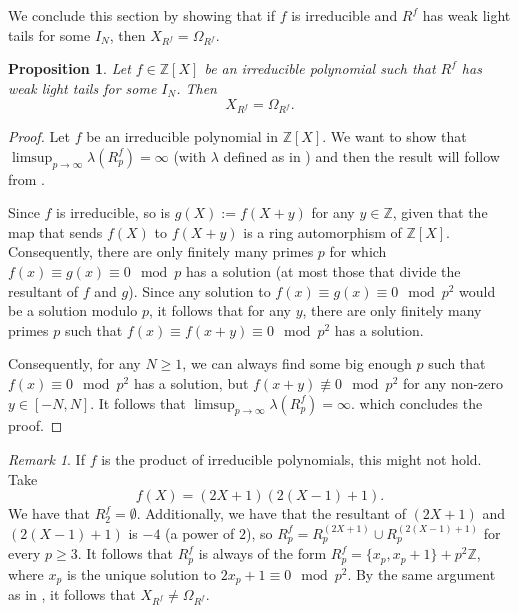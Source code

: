 \documentclass[a4paper,11pt,reqno]{amsart}
\theoremstyle{plain}
\newtheorem{proposition}[theorem]{Proposition}
\theoremstyle{remark}
\newtheorem{remark}[theorem]{Remark}
\newcommand{\z}{\mathbb{Z}}
\begin{document}
				
				We conclude this section by showing that if $f$ is irreducible and $R^f$ has weak light tails for some $I_N$, then $X_{R^f} = \Omega_{R^f}$.
				
				\begin{proposition}
					\label{prop: XRf equals ORf}
					Let $f\in \z[X]$ be an irreducible polynomial such that $R^f$ has weak light tails for some $I_N$. Then $$X_{R^f} = \Omega_{R^f}.$$
				\end{proposition}
				
				\begin{proof}
					Let $f$ be an irreducible polynomial in $\z[X]$. We want to show that $\limsup_{p \rightarrow \infty} \lambda(R_p^f) = \infty$ (with $\lambda$ defined as in ) and then the result will follow from . 
					
					Since $f$ is irreducible, so is $g(X) := f(X+y)$ for any $y \in \z$, given that the map that sends $f(X)$ to $f(X+y)$ is a ring automorphism of $\z[X]$. Consequently, there are only finitely many primes $p$ for which $f(x)\equiv g(x) \equiv 0 \mod p$ has a solution (at most those that divide the resultant of $f$ and $g$). Since any solution to $f(x)\equiv g(x) \equiv 0 \mod p^2$ would be a solution modulo $p$, it follows that for any $y$, there are only finitely many primes $p$ such that $f(x)\equiv f(x+y) \equiv 0 \mod p^2$ has a solution. 
					
					Consequently, for any $N\geq1$, we can always find some big enough $p$ such that $f(x) \equiv 0 \mod p^2$ has a solution, but $f(x+y) \not \equiv 0 \mod p^2$ for any non-zero $y \in [-N,N]$. It follows that $\limsup_{p \rightarrow \infty} \lambda(R_p^f) = \infty.$ which concludes the proof.		
				\end{proof}
				
				\begin{remark}
					If $f$ is the product of irreducible polynomials, this might not hold. Take $$f(X) = (2X+1)(2(X-1)+1).$$ We have that $R_2^f = \emptyset$. Additionally, we have that the resultant of $(2X+1)$ and $(2(X-1)+1)$ is $-4$ (a power of $2$), so $R^f_p = R^{(2X+1)}_p \cup R^{(2(X-1)+1)}_p$ for every $p  \geq 3$. It follows that $R^f_p$ is always of the form $R^f_p = \{x_p,x_p+1\}+p^2\z$, where $x_p$ is the unique solution to $2x_p +1 \equiv 0 \mod p^2$. By the same argument as in , it follows that $X_{R^f} \neq \Omega_{R^f}$.
				\end{remark}
				
\end{document}

